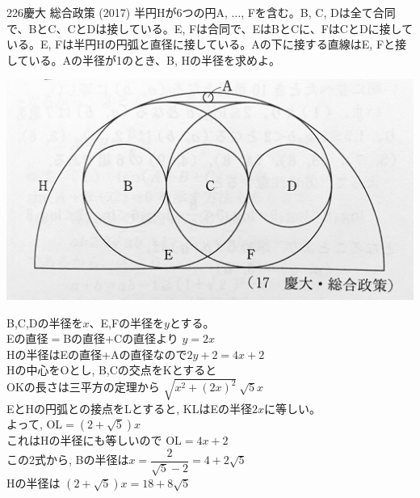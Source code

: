 \begin{thm}{226}{}{慶大 総合政策 (2017)}
 半円Hが6つの円A, $\ldots$, Fを含む。B, C, Dは全て合同で、BとC、CとDは接している。E, Fは合同で、EはBとCに、FはCとDに接している。E, Fは半円Hの円弧と直径に接している。Aの下に接する直線はE, Fと接している。Aの半径が1のとき、B, Hの半径を求めよ。
 \begin{center}
  \includegraphics[bb=0 0 1024 554,width=0.7\linewidth]{../problems/Q_226/Q_226.jpg}
 \end{center}
\end{thm}

B,C,Dの半径を$x$、E,Fの半径を$y$とする。\\
Eの直径$=$Bの直径+Cの直径より $y=2x$\\
Hの半径はEの直径+Aの直径なので$2y+2=4x+2$\\
Hの中心をOとし, B,Cの交点をKとすると\\
OKの長さは三平方の定理から $\sqrt{x^2+(2x)^2}~\sqrt{5}x$\\
EとHの円弧との接点をLとすると, KLはEの半径$2x$に等しい。\\
よって, OL$=(2+\sqrt{5})x$\\
これはHの半径にも等しいので OL$=4x+2$\\
この2式から, Bの半径は$x=\dfrac{2}{\sqrt{5}-2}=4+2\sqrt{5}$\\
Hの半径は $(2+\sqrt{5})x=18+8\sqrt{5}$ 
